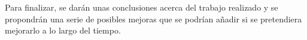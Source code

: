 Para finalizar, se darán unas conclusiones acerca del trabajo realizado y se propondrán una serie de posibles mejoras que se podrían añadir si se pretendiera mejorarlo a lo largo del tiempo.